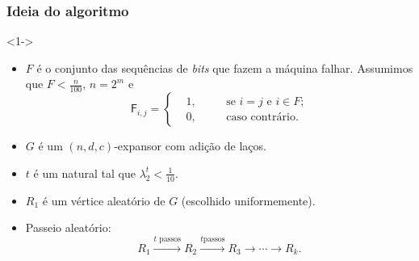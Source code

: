 \documentclass{beamer}
\def\MMp{\mathrm{.}} %
\def\matriz#1{\mathsf{#1}}
\theoremstyle{teoaxicorlem}
\theoremstyle{defnotnom}
\begin{document}
\begin{frame}
  \frametitle{Ideia do algoritmo}
  \begin{block}<1->{}
    \begin{itemize}
    \item $F$ é o conjunto das sequências de \textit{bits} que fazem a
      máquina falhar. Assumimos que $F<\frac{n}{100}$, $n=2^m$ e
      \begin{equation*}
        {\matriz F}_{i,j} = \left\{
          \begin{aligned}
            &1, &\quad &\text{se $i=j$ e $i\in F$;}\\
            &0, &\quad &\text{caso contrário.}
          \end{aligned}
        \right.
      \end{equation*}\pause
    \item $G$ é um $(n,d,c)$-expansor com adição de laços.\pause
    \item $t$ é um natural tal que $\lambda^t_2<\frac1{10}$.\pause
    \item $R_1$ é um vértice aleatório de $G$ (escolhido
      uniformemente).\pause
    \item Passeio aleatório:
      \begin{equation*}
        R_1\xrightarrow{t\text{ passos}}
        R_2\xrightarrow{t\text{passos}}
        R_3\xrightarrow{}\dotsb\xrightarrow{} R_k\MMp
      \end{equation*}
    \end{itemize}
  \end{block}
\end{frame}
\end{document}
